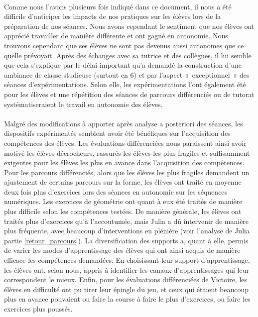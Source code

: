 \paragraph*{} Comme nous l'avons plusieurs fois indiqué dans ce document, il nous a été difficile d'anticiper les impacts de nos pratiques sur les élèves lors de la préparation de nos séances. Nous avons cependant le sentiment que nos élèves ont apprécié travailler de manière différente et ont gagné en autonomie. Nous trouvons cependant que ses élèves ne sont pas devenus aussi autonomes que ce quelle prévoyait. Après des échanges avec sa tutrice et des collègues, il lui semble que cela s'explique par le délai important qu'a demandé la construction d'une ambiance de classe studieuse (surtout en 6) et par l'aspect « exceptionnel » des séances d'expérimentations. Selon elle, les expérimentations l'ont également été pour les élèves et une répétition des séances de parcours différenciés ou de tutorat systématiseraient le travail en autonomie des élèves. \\
\\
Malgré des modifications à apporter après analyse a posteriori des séances, les dispositifs expérimentés semblent avoir été bénéfiques sur l'acquisition des compétences des élèves. Les évaluations différenciées nous paraissent ainsi avoir motivé les élèves décrocheurs, rassurés les élèves les plus fragiles et suffisamment exigentes pour les élèves les plus en avance dans l'acquisition des compétences. Pour les parcours différenciés, alors que les élèves les plus fragiles demandent un ajustement de certains parcours sur la forme, les élèves ont traité en moyenne deux fois plus d'exercices lors des séances en autonomie sur les séquences numériques. Les exercices de géométrie ont quant à eux été traités de manière plus difficile selon les compétences testées. De manière générale, les élèves ont traités plus d'exercices qu'à l'accoutumée, mais Julia a dû intervenir de manière plus fréquente, avec beaucoup d'interventions en plénière (voir l'analyse de Julia partie \ref{retour_parcours}). La diversification des supports a, quant à elle, permis de varier les modes d'apprentissage des élèves qui ont ainsi acquis de manière efficace les compétences demandées. En choisissant leur support d'apprentissage,
les élèves ont, selon nous, appris à identifier les canaux d'apprentissages
qui leur correspondent le mieux.
Enfin, pour les évaluations différenciées de Victoire, les élèves en difficulté
ont pu tirer leur épingle du jeu, et ceux qui étaient beaucoup plus en avance
pouvaient ou faire la course à faire le plus d'exercices, ou faire les exercices
plus poussés.\\
